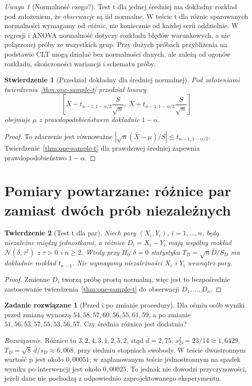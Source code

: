 \documentclass[11pt,a4paper,oneside]{report}
\numberwithin{equation}{chapter}
\theoremstyle{plain}
\newtheorem{twierdzenie}{Twierdzenie}[chapter]
\newtheorem{stwierdzenie}[twierdzenie]{Stwierdzenie}
\theoremstyle{definition}
\newtheorem{zadanie}{Zadanie rozwiązane}[chapter]
\theoremstyle{remark}
\newtheorem{uwaga}{Uwaga}[chapter]
\newcommand{\Normal}{\mathcal N}
\begin{document}
\begin{uwaga}[Normalność czego?]
Test t dla jednej średniej ma dokładny rozkład pod
założeniem, że \emph{obserwacje} są iid normalne. W teście t dla
różnic sparowanych normalności wymagamy od \emph{różnic}, nie
koniecznie od każdej serii oddzielnie. W regresji i ANOVA
normalność dotyczy rozkładu błędów warunkowych, a nie połączonej
próby ze wszystkich grup. Przy dużych próbach przybliżenia
na podstawie CLT mogą działać bez normalności danych, ale
zależą od ogonów rozkładu, skończoności wariancji i schematu
próby.
\end{uwaga}

\begin{stwierdzenie}[Przedział dokładny dla średniej normalnej]
Pod założeniami twierdzenia~\ref{thm:one-sample-t}
przedział losowy
\[
 \left[\bar X-t_{n-1,1-\alpha/2}\frac S{\sqrt n},\;
 \bar X+t_{n-1,1-\alpha/2}\frac S{\sqrt n}\right]
\]
obejmuje $\mu$ z prawdopodobieństwem dokładnie $1-\alpha$.
\end{stwierdzenie}
\begin{proof}
To zdarzenie jest równoważne
$|\sqrt n(\bar X-\mu)/S|\le t_{n-1,1-\alpha/2}$.
Twierdzenie~\ref{thm:one-sample-t} dla prawdziwej średniej
zapewnia prawdopodobieństwo $1-\alpha$.
\end{proof}

\section{Pomiary powtarzane: różnice par zamiast dwóch prób niezależnych}
\begin{twierdzenie}[Test t dla par]\label{thm:paired-t}
Niech pary $(X_i,Y_i)$, $i=1,\ldots,n$, będą niezależne
między jednostkami, a różnice $D_i=X_i-Y_i$ mają wspólny
rozkład $\Normal(\delta,\tau^2)$ z $\tau>0$ i $n\ge2$.
Wtedy przy $H_0:\delta=0$ statystyka
$T_D=\sqrt n\bar D/S_D$ ma dokładnie rozkład $t_{n-1}$.
Nie wymagamy niezależności $X_i$ i $Y_i$ wewnątrz pary.
\end{twierdzenie}
\begin{proof}
Zmienne $D_i$ tworzą próbę prostą normalną, więc jest to
bezpośrednie zastosowanie twierdzenia~\ref{thm:one-sample-t}
do obserwacji $D_1,\ldots,D_n$.
\end{proof}

\begin{zadanie}[Przed i po zmianie procedury]
Dla ośmiu osób wyniki przed zmianą wynoszą
$54,58,57,60,56,55,61,59$, a po zmianie
$51,56,53,57,55,53,56,57$. Czy średnia różnica jest dodatnia?
\par\emph{Rozwiązanie.} Różnice to
$3,2,4,3,1,2,5,2$, stąd
$\bar d=2{,}75$, $s_D^2=23/14\approx1{,}6429$,
$T_D=\sqrt8\,\bar d/s_D\approx6{,}068$,
przy siedmiu stopniach swobody. W teście dwustronnym
wartość p jest około $0{,}00051$; w zaplanowanym teście
jednostronnym na spadek wyniku po interwencji jest około
$0{,}00025$. To jednak nie dowodzi przyczynowości, jeżeli
dane nie pochodzą z odpowiednio zaprojektowanego eksperymentu.
\end{zadanie}
\end{document}
